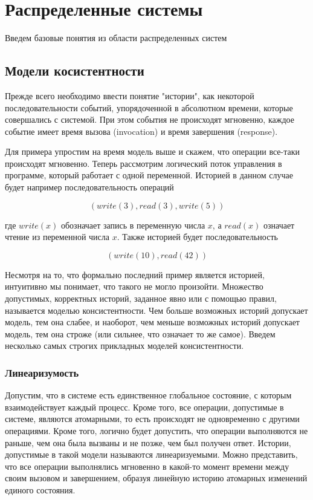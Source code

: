 \section{Распределенные системы}

Введем базовые понятия из области распределенных систем

\subsection{Модели косистентности}

Прежде всего необходимо ввести понятие "истории", как некоторой последовательности событий, упорядоченной в абсолютном времени, которые совершались с системой. При этом события не происходят мгновенно, каждое событие имеет время вызова (invocation) и время завершения (response).

Для примера упростим на время модель выше и скажем, что операции все-таки происходят мгновенно. Теперь рассмотрим логический поток управления в программе, который работает с одной переменной. Историей в данном случае будет например последовательность операций

$$ (write(3), read(3), write(5)) $$

где $write(x)$ обозначает запись в переменную числа $x$, а $read(x)$ означает чтение из переменной числа $x$. Также историей будет последовательность

$$ (write(10), read(42)) $$

Несмотря на то, что формально последний пример является историей, интуитивно мы понимает, что такого не могло произойти. Множество допустимых, корректных историй, заданное явно или с помощью правил, называется моделью консистентности. Чем больше возможных историй допускает модель, тем она слабее, и наоборот, чем меньше возможных историй допускает модель, тем она строже (или сильнее, что означает то же самое). Введем несколько самых строгих прикладных моделей консистентности.

\subsubsection{Линеаризумость}

Допустим, что в системе есть единственное глобальное состояние, с которым взаимодействует каждый процесс. Кроме того, все операции, допустимые в системе, являются атомарными, то есть происходят не одновременно с другими операциями. Кроме того, логично будет допустить, что операции выполняются не раньше, чем она была вызваны и не позже, чем был получен ответ. Истории, допустимые в такой модели называются линеаризуемыми. Можно представить, что все операции выполнялись мгновенно в какой-то момент времени между своим вызовом и завершением, образуя линейную историю атомарных изменений единого состояния.

